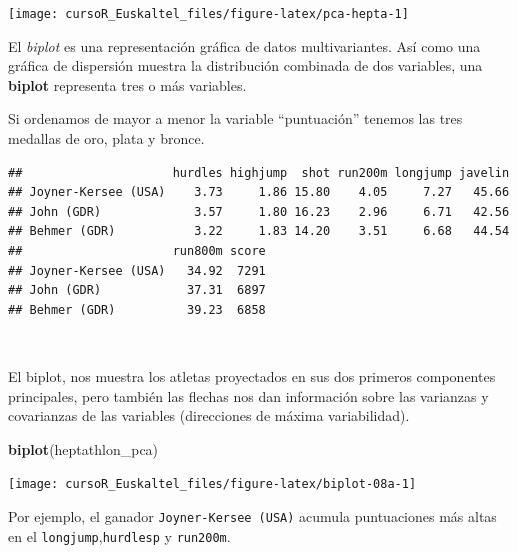 \documentclass[]{book}
\newenvironment{Shaded}{\begin{snugshade}}{\end{snugshade}}
\newcommand{\KeywordTok}[1]{\textcolor[rgb]{0.13,0.29,0.53}{\textbf{#1}}}
\newcommand{\DataTypeTok}[1]{\textcolor[rgb]{0.13,0.29,0.53}{#1}}
\newcommand{\DecValTok}[1]{\textcolor[rgb]{0.00,0.00,0.81}{#1}}
\newcommand{\OtherTok}[1]{\textcolor[rgb]{0.56,0.35,0.01}{#1}}
\newcommand{\OperatorTok}[1]{\textcolor[rgb]{0.81,0.36,0.00}{\textbf{#1}}}
\newcommand{\NormalTok}[1]{#1}
\begin{document}
\begin{center}\texttt{[image: cursoR\_Euskaltel\_files/figure-latex/pca-hepta-1]} \end{center}

El \emph{biplot} es una representación gráfica de datos multivariantes.
Así como una gráfica de dispersión muestra la distribución combinada de
dos variables, una \textbf{biplot} representa tres o más variables.

Si ordenamos de mayor a menor la variable ``puntuación'' tenemos las
tres medallas de oro, plata y bronce.

\begin{Shaded}
\end{Shaded}

\begin{verbatim}
##                     hurdles highjump  shot run200m longjump javelin
## Joyner-Kersee (USA)    3.73     1.86 15.80    4.05     7.27   45.66
## John (GDR)             3.57     1.80 16.23    2.96     6.71   42.56
## Behmer (GDR)           3.22     1.83 14.20    3.51     6.68   44.54
##                     run800m score
## Joyner-Kersee (USA)   34.92  7291
## John (GDR)            37.31  6897
## Behmer (GDR)          39.23  6858
\end{verbatim}

~

El biplot, nos muestra los atletas proyectados en sus dos primeros
componentes principales, pero también las flechas nos dan información
sobre las varianzas y covarianzas de las variables (direcciones de
máxima variabilidad).

\begin{Shaded}
\begin{Highlighting}[]
\KeywordTok{biplot}\NormalTok{(heptathlon_pca)}
\end{Highlighting}
\end{Shaded}

\begin{center}\texttt{[image: cursoR\_Euskaltel\_files/figure-latex/biplot-08a-1]} \end{center}

Por ejemplo, el ganador \texttt{Joyner-Kersee\ (USA)} acumula
puntuaciones más altas en el \texttt{longjump},\texttt{hurdlesp} y
\texttt{run200m}.
\end{document}
